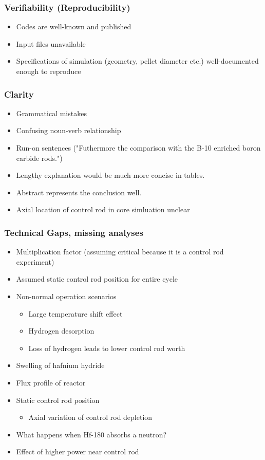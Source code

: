 \documentclass[9pt]{beamer}
\begin{document}
\begin{frame}
\frametitle{Verifiability (Reproducibility)}
\begin{itemize}
  \item Codes are well-known and published
  \item Input files unavailable
  \item Specifications of simulation (geometry, pellet diameter etc.) well-documented enough to reproduce
\end{itemize}
\end{frame}


\begin{frame}
\frametitle{Clarity}
\begin{itemize}
  \item Grammatical mistakes 
  \item Confusing noun-verb relationship
  \item Run-on sentences ("Futhermore the comparison with the B-10 enriched boron carbide rods.")
  \item Lengthy explanation would be much more concise in tables.
  \item Abstract represents the conclusion well.
  \item Axial location of control rod in core simluation unclear
\end{itemize}
\end{frame}


\begin{frame}
\frametitle{Technical Gaps, missing analyses}
\begin{itemize}
    \item Multiplication factor (assuming critical because it is a control rod experiment)
    \item Assumed static control rod position for entire cycle
    \item Non-normal operation scenarios
    \begin{itemize}
        \item Large temperature shift effect
        \item Hydrogen desorption
        \item Loss of hydrogen leads to lower control rod worth
    \end{itemize}
    \item Swelling of hafnium hydride
    \item Flux profile of reactor
    \item Static control rod position
    \begin{itemize}
        \item Axial variation of control rod depletion
    \end{itemize}
    \item What happens when Hf-180 absorbs a neutron?
    \item Effect of higher power near control rod
\end{itemize}
\end{frame}
\end{document}
